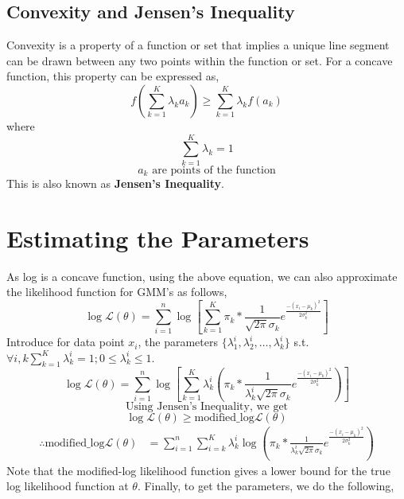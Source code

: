 \documentclass[
]{article}
\begin{document}
\hypertarget{convexity-and-jensens-inequality}{%
\subsection{Convexity and Jensen's
Inequality}\label{convexity-and-jensens-inequality}}

Convexity is a property of a function or set that implies a unique line
segment can be drawn between any two points within the function or set.
For a concave function, this property can be expressed as, \[
f \left (\sum _{k=1} ^K \lambda_k a_k \right ) \ge \sum _{k=1} ^K \lambda_k f(a_k)
\] where \[
\sum _{k=1} ^K \lambda _k = 1 
\] \[
a_k \text{ are points of the function}
\] This is also known as \textbf{Jensen's Inequality}.

\hypertarget{estimating-the-parameters}{%
\section{Estimating the Parameters}\label{estimating-the-parameters}}

As log is a concave function, using the above equation, we can also
approximate the likelihood function for GMM's as follows, \[
\log\mathcal{L}(\theta) = \sum _{i=1} ^n \log \left [ \sum _{k=1} ^K \pi_k * \frac{1}{\sqrt{2\pi}\sigma_k} e^{\frac{-(x_i-\mu_k)^2}{2\sigma^2_k}} \right ]
\] Introduce for data point \(x_i\), the parameters
\(\{\lambda_1^i, \lambda_2^i, \ldots, \lambda_k^i\}\) s.t.
\(\forall i,k \displaystyle \sum _{k=1} ^K \lambda _k^i = 1; 0 \le \lambda _k^i \le 1\).
\[
\log\mathcal{L}(\theta) = \sum _{i=1} ^n \log \left [ \sum _{k=1} ^K \lambda _k ^i \left ( \pi_k * \frac{1}{\lambda _k ^i\sqrt{2\pi}\sigma_k} e^{\frac{-(x_i-\mu_k)^2}{2\sigma^2_k}} \right ) \right ]
\] \[ \text{Using Jensen's Inequality, we get} \] \[
\log\mathcal{L}(\theta) \ge \text{modified\_log}\mathcal{L}(\theta)
\] \begin{align}
\therefore \text{modified\_log}\mathcal{L}(\theta) 
&= \sum _{i=1} ^n \sum _{i=k} ^K \lambda _k ^i \log \left ( \pi_k * \frac{1}{\lambda _k ^i\sqrt{2\pi}\sigma_k} e^{\frac{-(x_i-\mu_k)^2}{2\sigma^2_k}} \right )
\end{align} Note that the modified-log likelihood function gives a lower
bound for the true log likelihood function at \(\theta\). Finally, to
get the parameters, we do the following,
\end{document}
